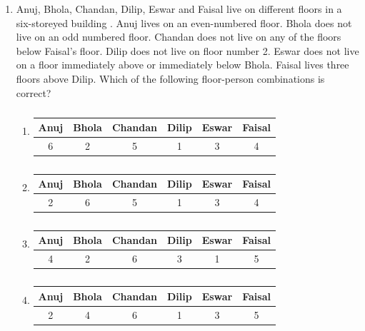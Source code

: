 \documentclass[a4paper,10pt]{article}
\begin{document}
\begin{enumerate}
    \item Anuj, Bhola, Chandan, Dilip, Eswar and Faisal live on different floors in a six-storeyed building . Anuj lives on an even-numbered floor. Bhola does not live on an odd numbered floor. Chandan does not live on any of the floors below Faisal's floor. Dilip does not live on floor number 2. Eswar does not live on a floor immediately above or immediately below Bhola. Faisal lives three floors above Dilip. Which of the following floor-person combinations is correct?
    
    \hfill{}
    \begin{enumerate}
        \item 
        \begin{table}[H] \centering \caption*{} \label{tab:q7ga_a} \begin{tabular}{|c|c|c|c|c|c|} \hline Anuj & Bhola & Chandan & Dilip & Eswar & Faisal \\ \hline 6 & 2 & 5 & 1 & 3 & 4 \\ \hline \end{tabular} \end{table}
        \item 
        \begin{table}[H] \centering \caption*{} \label{tab:q7ga_b} \begin{tabular}{|c|c|c|c|c|c|} \hline Anuj & Bhola & Chandan & Dilip & Eswar & Faisal \\ \hline 2 & 6 & 5 & 1 & 3 & 4 \\ \hline \end{tabular} \end{table}
        \item 
        \begin{table}[H] \centering \caption*{} \label{tab:q7ga_c} \begin{tabular}{|c|c|c|c|c|c|} \hline Anuj & Bhola & Chandan & Dilip & Eswar & Faisal \\ \hline 4 & 2 & 6 & 3 & 1 & 5 \\ \hline \end{tabular} \end{table}
        \item 
        \begin{table}[H] \centering \caption*{} \label{tab:q7ga_d} \begin{tabular}{|c|c|c|c|c|c|} \hline Anuj & Bhola & Chandan & Dilip & Eswar & Faisal \\ \hline 2 & 4 & 6 & 1 & 3 & 5 \\ \hline \end{tabular} \end{table}
    \end{enumerate}
    

\end{enumerate}
\end{document}
